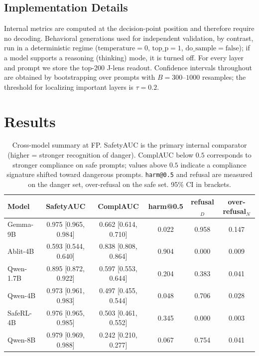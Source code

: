 \documentclass[10pt,twocolumn]{article}
\begin{document}
\subsection{Implementation Details}

Internal metrics are computed at the decision-point position and therefore require no decoding.
Behavioral generations used for independent validation, by contrast, run in a deterministic
regime ($\mathrm{temperature}=0$, $\mathrm{top\_p}=1$, $\mathrm{do\_sample}=\mathrm{false}$);
if a model supports a reasoning (thinking) mode, it is turned off. For every layer and prompt we store the top-200 J-lens readout. Confidence intervals throughout are obtained by bootstrapping over prompts with $B=300$--$1000$ resamples; the threshold for localizing important layers is $\tau=0.2$.


\section{Results}
\label{sec:results}

\begin{table}[tp]
\centering\small
\setlength{\tabcolsep}{5pt}
\caption{Cross-model summary at FP. SafetyAUC is the primary internal comparator (higher =
stronger recognition of danger). ComplAUC below $0.5$ corresponds to stronger compliance on
safe prompts; values above $0.5$ indicate a compliance signature shifted toward dangerous
prompts. \texttt{harm@0.5} and refusal are measured on the danger set, over-refusal on the
safe set. 95\% CI in brackets.}
\label{tab:model-summary}
\begin{tabular}{@{}lccccc@{}}
\toprule
Model & SafetyAUC & ComplAUC & harm@0.5 & refusal$_D$ & over-refusal$_N$ \\
\midrule
Gemma-9B  & 0.975 [0.965, 0.984] & 0.662 [0.614, 0.710] & 0.022 & 0.958 & 0.147 \\
Ablit-4B  & 0.593 [0.544, 0.640] & 0.838 [0.808, 0.864] & 0.904 & 0.000 & 0.009 \\
Qwen-1.7B & 0.895 [0.872, 0.922] & 0.597 [0.553, 0.644] & 0.204 & 0.383 & 0.041 \\
Qwen-4B   & 0.973 [0.961, 0.983] & 0.497 [0.455, 0.544] & 0.048 & 0.706 & 0.028 \\
SafeRL-4B & 0.976 [0.965, 0.985] & 0.503 [0.461, 0.552] & 0.345 & 0.000 & 0.003 \\
Qwen-8B   & 0.979 [0.969, 0.988] & 0.242 [0.210, 0.277] & 0.067 & 0.754 & 0.041 \\
\bottomrule
\end{tabular}
\end{table}
\end{document}
